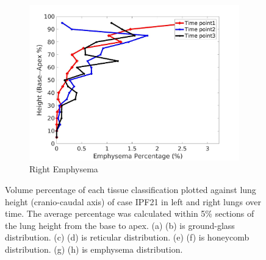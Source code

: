 \begin{figure}[H]
\begin{subfigure}{.42\linewidth}
  \includegraphics[width=\linewidth,trim={{.0\wd0} {.0\wd0} {.0\wd0} {.0\wd0}},clip]{Appendix/Image_AppexA/BaseToApex/IPF21RightLungEmphysemaDiseaseAgainstHeight.jpg}
  \caption{Right Emphysema}
  \label{fig:IPF21DiseaseAgainstHeight-h}
\end{subfigure}
\caption{Volume percentage of each tissue classification plotted against lung height (cranio-caudal axis) of case IPF21 in left and right lungs over time. The average percentage was calculated within 5\% sections of the lung height from the base to apex. (a) (b) is ground-glass distribution. (c) (d) is reticular distribution. (e) (f) is honeycomb distribution. (g) (h) is emphysema distribution.}
\label{fig:IPF21DiseaseAgainstHeight}
\end{figure}

